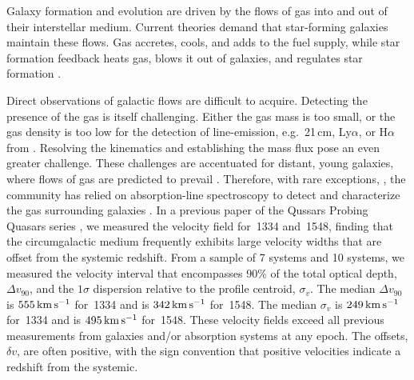 \documentclass[iop]{emulateapj}
\begin{document}
Galaxy formation and evolution are driven by the flows of gas into and out of their interstellar
medium. Current theories demand that star-forming galaxies maintain these flows. Gas accretes,
cools, and adds to the fuel supply, while star formation feedback heats gas, blows it out of
galaxies, and regulates star formation \citep[for a review see][]{SomervilleDave15}.

Direct observations of galactic flows are difficult to acquire. Detecting the presence of
the gas is itself challenging. Either the gas mass is too small, or the gas density is too low for
the detection of line-emission, e.g.\ 21\,cm, Ly$\alpha$, or H$\alpha$ from . Resolving
the kinematics and establishing the mass flux pose an even greater challenge. These challenges are
accentuated for distant, young galaxies, where flows of gas are predicted to prevail
\citep{Keres+09,Fumagalli+11}. Therefore, with rare exceptions,
\citep[e.g.,][]{Cantalupo+14,Hennawi+15}, the community has relied on absorption-line spectroscopy
to detect and characterize the gas surrounding galaxies
\citep[e.g.,][]{BergeronBoisse91,Steidel+10,Prochaska+11,Tumlinson+13}.
In a previous paper of the Qussars Probing Quasars series \citep[][, hereafter QPQ8]{QPQ8}, we
measured the velocity field for \,1334 and \,1548, finding that the
circumgalactic medium frequently exhibits large velocity widths that are offset from the systemic
redshift.
From a sample of 7  systems and 10 
systems, we measured the velocity interval that encompasses 90\% of the total optical depth,
$\Delta v_{90}$, and the $1\sigma$ dispersion relative to the profile centroid, $\sigma_v$.
The median $\Delta v_{90}$ is $555\,{\rm km\,s^{-1}}$ for \,1334 and is
$342\,{\rm km\,s^{-1}}$ for \,1548. The median $\sigma_v$ is $249\,{\rm km\,s^{-1}}$ for
\,1334 and is $495\,{\rm km\,s^{-1}}$ for \,1548. These velocity fields exceed
all previous measurements from galaxies and/or absorption systems at any epoch.
The offsets, $\delta v$, are often positive, with the sign convention that positive
velocities indicate a redshift from the systemic.
\end{document}
